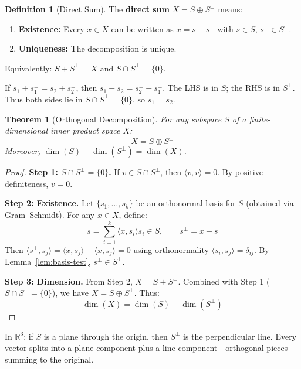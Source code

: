 \documentclass[10pt, twocolumn]{article}
\theoremstyle{definition}
\newtheorem{definition}{Definition}
\theoremstyle{plain}
\newtheorem{theorem}{Theorem}
\newcommand{\RR}{\mathbb{R}}
\begin{document}
\begin{definition}[Direct Sum]
The \textbf{direct sum} $X = S \oplus S^\perp$ means:
\begin{enumerate}[label=(\roman*)]
    \item \textbf{Existence:} Every $x \in X$ can be written as $x = s + s^\perp$ with $s \in S$, $s^\perp \in S^\perp$.
    \item \textbf{Uniqueness:} The decomposition is unique.
\end{enumerate}
Equivalently: $S + S^\perp = X$ and $S \cap S^\perp = \{0\}$.
\end{definition}

\begin{tcolorbox}[colframe=black!50, title={\small Why Uniqueness Follows from $S \cap S^\perp = \{0\}$}]
If $s_1 + s_1^\perp = s_2 + s_2^\perp$, then $s_1 - s_2 = s_2^\perp - s_1^\perp$. The LHS is in $S$; the RHS is in $S^\perp$. Thus both sides lie in $S \cap S^\perp = \{0\}$, so $s_1 = s_2$.
\end{tcolorbox}

\begin{theorem}[Orthogonal Decomposition]
For any subspace $S$ of a finite-dimensional inner product space $X$:
\[
    X = S \oplus S^\perp
\]
Moreover, $\dim(S) + \dim(S^\perp) = \dim(X)$.
\end{theorem}

\begin{proof}
\textbf{Step 1: $S \cap S^\perp = \{0\}$.} If $v \in S \cap S^\perp$, then $\langle v, v \rangle = 0$. By positive definiteness, $v = 0$.

\textbf{Step 2: Existence.} Let $\{s_1, \ldots, s_k\}$ be an orthonormal basis for $S$ (obtained via Gram--Schmidt). For any $x \in X$, define:
\[
s = \sum_{i=1}^k \langle x, s_i \rangle s_i \in S, \qquad s^\perp = x - s
\]
Then $\langle s^\perp, s_j \rangle = \langle x, s_j \rangle - \langle x, s_j \rangle = 0$ using orthonormality $\langle s_i, s_j \rangle = \delta_{ij}$. By Lemma~\ref{lem:basis-test}, $s^\perp \in S^\perp$.

\textbf{Step 3: Dimension.} From Step 2, $X = S + S^\perp$. Combined with Step 1 ($S \cap S^\perp = \{0\}$), we have $X = S \oplus S^\perp$. Thus:
\[
\dim(X) = \dim(S) + \dim(S^\perp)
\]
\end{proof}

\begin{tcolorbox}[colframe=black!50, title={\small Geometric Intuition}]
In $\RR^3$: if $S$ is a plane through the origin, then $S^\perp$ is the perpendicular line. Every vector splits into a plane component plus a line component---orthogonal pieces summing to the original.
\end{tcolorbox}
\end{document}
